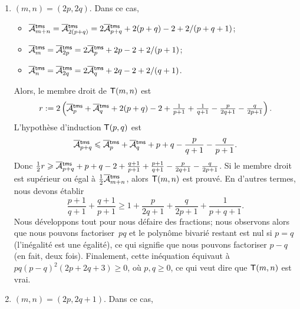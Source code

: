 \begin{enumerate}

  \item \((m,n) = (2p,2q)\). Dans ce cas,
    \begin{itemize}

      \item \(\OM{\fun{tms}}{m+n} = \OM{\fun{tms}}{2(p+q)} =
        2\OM{\fun{tms}}{p+q} + 2(p+q) - 2 + 2/(p+q+1)\);

      \item \(\OM{\fun{tms}}{m} = \OM{\fun{tms}}{2p} =
        2\OM{\fun{tms}}{p} + 2p - 2 + 2/(p+1)\);

      \item \(\OM{\fun{tms}}{n} = \OM{\fun{tms}}{2q} =
        2\OM{\fun{tms}}{q} + 2q - 2 + 2/(q+1)\).

    \end{itemize}
    Alors, le membre droit de \(\textsf{T}({m,n})\) est
    \begin{equation*}
      r := 2\left(\OM{\fun{tms}}{p} + \OM{\fun{tms}}{q} + 2(p+q) - 2 +
        \tfrac{1}{p+1} + \tfrac{1}{q+1} - \tfrac{p}{2q+1} -
        \tfrac{q}{2p+1}\right).
    \end{equation*}
    L'hypothèse d'induction \(\textsf{T}({p,q})\) est
    \begin{equation*}
      \OM{\fun{tms}}{p+q} \leqslant \OM{\fun{tms}}{p} +
      \OM{\fun{tms}}{q} + p + q - \frac{p}{q+1} - \frac{q}{p+1}.
    \end{equation*}
    Donc \(\tfrac{1}{2}r \geqslant \OM{\fun{tms}}{p+q} + p + q - 2 +
    \tfrac{q+1}{p+1} + \tfrac{p+1}{q+1} - \tfrac{p}{2q+1} -
    \tfrac{q}{2p+1}\). Si le membre droit est supérieur ou égal à
    \(\tfrac{1}{2}\OM{\fun{tms}}{m+n}\), alors \(\textsf{T}({m,n})\) est
    prouvé. En d'autres termes, nous devons établir
    \begin{equation*}
      \frac{p+1}{q+1} + \frac{q+1}{p+1} \geqslant 1 +
      \frac{p}{2q+1} + \frac{q}{2p+1} + \frac{1}{p+q+1}.
    \end{equation*}
    Nous développons tout pour nous défaire des fractions; nous
    observons alors que nous pouvons factoriser~\(pq\) et le polynôme
    bivarié restant est nul si \(p=q\) (l'inégalité est une égalité),
    ce qui signifie que nous pouvons factoriser \(p-q\) (en fait, deux
    fois). Finalement, cette inéquation équivaut à
    \(pq(p-q)^2(2p+2q+3) \geqslant 0\), où \(p,q \geqslant 0\), ce qui
    veut dire que \(\textsf{T}({m,n})\) est vrai.

  \item \((m,n) = (2p,2q+1)\). Dans ce cas,
    \begin{itemize}


\end{itemize}
\end{enumerate}
